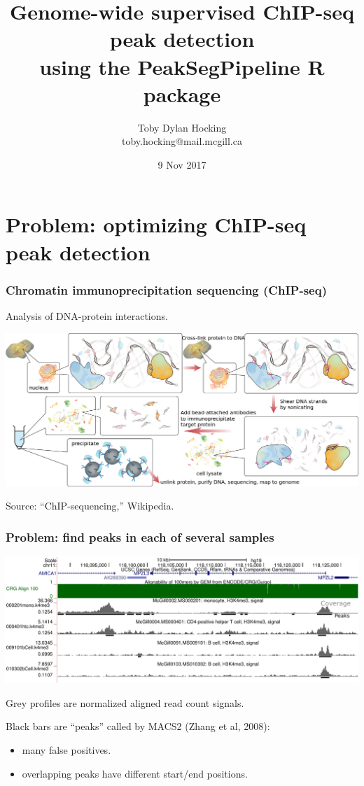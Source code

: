 \documentclass{beamer}
\begin{document}
\title{Genome-wide supervised ChIP-seq peak detection\\
using the
  PeakSegPipeline R package}

\author{
  Toby Dylan Hocking\\
  toby.hocking@mail.mcgill.ca\\
}


\date{9 Nov 2017}

\maketitle

\section{Problem: optimizing ChIP-seq peak detection}

\begin{frame}
  \frametitle{Chromatin immunoprecipitation sequencing (ChIP-seq)}
  Analysis of DNA-protein interactions.

  \includegraphics[width=\textwidth]{Chromatin_immunoprecipitation_sequencing_wide.png}

  Source: ``ChIP-sequencing,'' Wikipedia.
\end{frame}

\begin{frame}
  \frametitle{Problem: find peaks in each of several samples}
  \includegraphics[width=\textwidth]{screenshot-ucsc-edited}

  Grey profiles are normalized aligned read count signals.

  Black bars are ``peaks'' called by MACS2 (Zhang et al, 2008):
  \begin{itemize}
  \item many false positives.
  \item overlapping peaks have different start/end positions.
  \end{itemize}
\end{frame}
\end{document}
